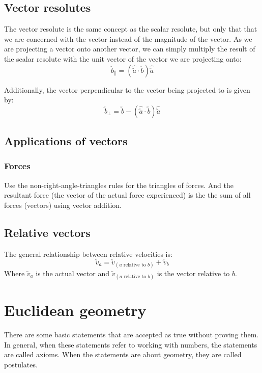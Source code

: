 \documentclass[a4paper,10pt]{report}
\begin{document}
\subsection{Vector resolutes}
The vector resolute is the same concept as the scalar resolute, but only that that we are concerned with the vector instead of the magnitude of the vector.  As we are projecting a vector onto another vector, we can simply multiply the result of the scalar resolute with the unit vector of the vector we are projecting onto:
$$
	\utilde{b}_{\parallel} = (\hat{\utilde{a}} \cdot \utilde{b}) \hat{\utilde{a}}
$$

Additionally, the vector perpendicular to the vector being projected to is given by:
$$
	\utilde{b}_{\perp} = \utilde{b} - (\hat{\utilde{a}} \cdot \utilde{b}) \hat{\utilde{a}}
$$

\subsection{Applications of vectors}
\subsubsection{Forces}
Use the non-right-angle-triangles rules for the triangles of forces.  And the resultant force (the vector of the actual force experienced) is the the sum of all forces (vectors) using vector addition.

\subsection{Relative vectors}
The general relationship between relative velocities is:
$$
	\utilde{v}_a = \utilde{v}_{(\text{$a$ relative to $b$})} + \utilde{v}_b
$$
Where $\utilde{v}_a$ is the actual vector and $\utilde{v}_{(\text{$a$ relative to $b$})}$ is the vector relative to $b$.

\section{Euclidean geometry}
There are some basic statements that are accepted as true without proving them.  In general, when these statements refer to working with numbers, the statements are called axioms.  When the statements are about geometry, they are called postulates.
\end{document}
